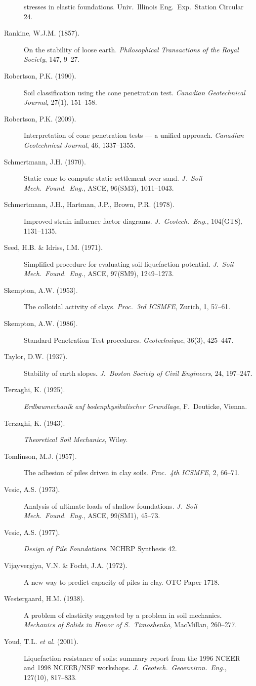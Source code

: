 \documentclass[11pt,a4paper,openany]{book}
\begin{document}
\begin{description}
  stresses in elastic foundations. Univ.\ Illinois Eng.\ Exp.\
  Station Circular 24.
\item[Rankine, W.J.M. (1857).] On the stability of loose earth.
  \emph{Philosophical Transactions of the Royal Society},
  147, 9--27.
\item[Robertson, P.K. (1990).] Soil classification using the cone
  penetration test. \emph{Canadian Geotechnical Journal},
  27(1), 151--158.
\item[Robertson, P.K. (2009).] Interpretation of cone penetration
  tests --- a unified approach. \emph{Canadian Geotechnical
  Journal}, 46, 1337--1355.
\item[Schmertmann, J.H. (1970).] Static cone to compute static
  settlement over sand. \emph{J.\ Soil Mech.\ Found.\ Eng.},
  ASCE, 96(SM3), 1011--1043.
\item[Schmertmann, J.H., Hartman, J.P., Brown, P.R. (1978).]
  Improved strain influence factor diagrams. \emph{J.\ Geotech.\
  Eng.}, 104(GT8), 1131--1135.
\item[Seed, H.B. \& Idriss, I.M. (1971).] Simplified procedure for
  evaluating soil liquefaction potential. \emph{J.\ Soil Mech.\
  Found.\ Eng.}, ASCE, 97(SM9), 1249--1273.
\item[Skempton, A.W. (1953).] The colloidal activity of clays.
  \emph{Proc.\ 3rd ICSMFE}, Zurich, 1, 57--61.
\item[Skempton, A.W. (1986).] Standard Penetration Test procedures.
  \emph{Geotechnique}, 36(3), 425--447.
\item[Taylor, D.W. (1937).] Stability of earth slopes.
  \emph{J.\ Boston Society of Civil Engineers}, 24, 197--247.
\item[Terzaghi, K. (1925).] \emph{Erdbaumechanik auf
  bodenphysikalischer Grundlage}, F.\ Deuticke, Vienna.
\item[Terzaghi, K. (1943).] \emph{Theoretical Soil Mechanics},
  Wiley.
\item[Tomlinson, M.J. (1957).] The adhesion of piles driven in
  clay soils. \emph{Proc.\ 4th ICSMFE}, 2, 66--71.
\item[Vesic, A.S. (1973).] Analysis of ultimate loads of shallow
  foundations. \emph{J.\ Soil Mech.\ Found.\ Eng.}, ASCE, 99(SM1),
  45--73.
\item[Vesic, A.S. (1977).] \emph{Design of Pile Foundations}.
  NCHRP Synthesis 42.
\item[Vijayvergiya, V.N. \& Focht, J.A. (1972).] A new way to
  predict capacity of piles in clay. OTC Paper 1718.
\item[Westergaard, H.M. (1938).] A problem of elasticity suggested
  by a problem in soil mechanics. \emph{Mechanics of Solids in
  Honor of S.\ Timoshenko}, MacMillan, 260--277.
\item[Youd, T.L. \emph{et al.} (2001).] Liquefaction resistance
  of soils: summary report from the 1996 NCEER and 1998
  NCEER/NSF workshops. \emph{J.\ Geotech.\ Geoenviron.\ Eng.},
  127(10), 817--833.
\end{description}

\cleardoublepage
\printindex
\end{document}
